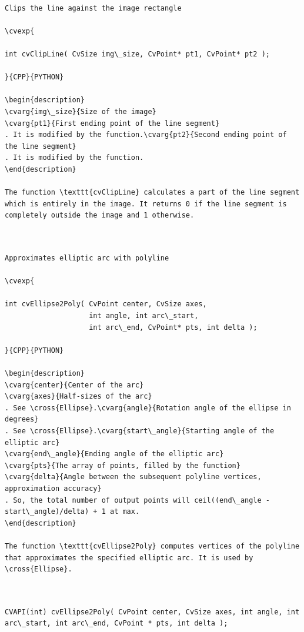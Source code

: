 \label{ClipLine}
\begin{verbatim}

Clips the line against the image rectangle

\cvexp{

int cvClipLine( CvSize img\_size, CvPoint* pt1, CvPoint* pt2 );

}{CPP}{PYTHON}

\begin{description}
\cvarg{img\_size}{Size of the image}
\cvarg{pt1}{First ending point of the line segment}
. It is modified by the function.\cvarg{pt2}{Second ending point of the line segment}
. It is modified by the function.
\end{description}

The function \texttt{cvClipLine} calculates a part of the line segment which is entirely in the image. It returns 0 if the line segment is completely outside the image and 1 otherwise.


\end{verbatim}
\label{Ellipse2Poly}
\begin{verbatim}

Approximates elliptic arc with polyline

\cvexp{

int cvEllipse2Poly( CvPoint center, CvSize axes,
                    int angle, int arc\_start,
                    int arc\_end, CvPoint* pts, int delta );

}{CPP}{PYTHON}

\begin{description}
\cvarg{center}{Center of the arc}
\cvarg{axes}{Half-sizes of the arc}
. See \cross{Ellipse}.\cvarg{angle}{Rotation angle of the ellipse in degrees}
. See \cross{Ellipse}.\cvarg{start\_angle}{Starting angle of the elliptic arc}
\cvarg{end\_angle}{Ending angle of the elliptic arc}
\cvarg{pts}{The array of points, filled by the function}
\cvarg{delta}{Angle between the subsequent polyline vertices, approximation accuracy}
. So, the total number of output points will ceil((end\_angle - start\_angle)/delta) + 1 at max.
\end{description}

The function \texttt{cvEllipse2Poly} computes vertices of the polyline that approximates the specified elliptic arc. It is used by \cross{Ellipse}.


\end{verbatim}
\label{ClipLine}
\begin{verbatim}

CVAPI(int) cvEllipse2Poly( CvPoint center, CvSize axes, int angle, int arc\_start, int arc\_end, CvPoint * pts, int delta );


\end{verbatim}
